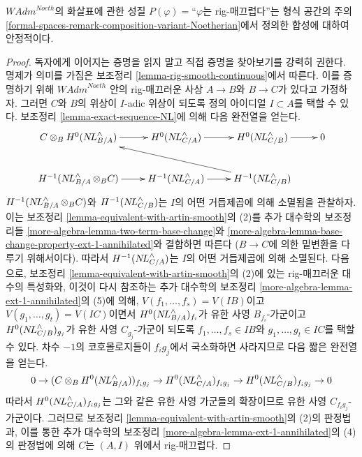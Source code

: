 \begin{lemma}
\label{lemma-composition-rig-smooth-continuous}
$\textit{WAdm}^{Noeth}$의 화살표에 관한 성질
$P(\varphi)=$``$\varphi$는 rig-매끄럽다''는 형식 공간의 주의
\ref{formal-spaces-remark-composition-variant-Noetherian}에서 정의한
합성에 대하여 안정적이다.
\end{lemma}

\begin{proof}
독자에게 이어지는 증명을 읽지 말고 직접 증명을 찾아보기를 강력히 권한다.
명제가 의미를 가짐은 보조정리 \ref{lemma-rig-smooth-continuous}에서 따른다.
이를 증명하기 위해 $\textit{WAdm}^{Noeth}$ 안의 rig-매끄러운 사상
$A \to B$와 $B \to C$가 있다고 가정하자.
그러면 $C$와 $B$의 위상이 $I$-adic 위상이 되도록
정의 아이디얼 $I \subset A$를 택할 수 있다.
보조정리 \ref{lemma-exact-sequence-NL}에 의해 다음 완전열을 얻는다.
$$
\xymatrix{
C \otimes_B H^0(\NL_{B/A}^\wedge) \ar[r] &
H^0(\NL_{C/A}^\wedge) \ar[r] &
H^0(\NL_{C/B}^\wedge) \ar[r] & 0 \\
H^{-1}(\NL_{B/A}^\wedge \otimes_B C) \ar[r] &
H^{-1}(\NL_{C/A}^\wedge) \ar[r] &
H^{-1}(\NL_{C/B}^\wedge) \ar[llu]
}
$$
$H^{-1}(\mathop{N\!L}\nolimits_{B/A}^\wedge \otimes_B C)$와
$H^{-1}(\mathop{N\!L}\nolimits_{C/B}^\wedge)$는 $I$의 어떤 거듭제곱에 의해 소멸됨을 관찰하자.
이는 보조정리 \ref{lemma-equivalent-with-artin-smooth}의 (2)를
추가 대수학의 보조정리들
\ref{more-algebra-lemma-two-term-base-change}와
\ref{more-algebra-lemma-base-change-property-ext-1-annihilated}와 결합하면 따른다
($B \to C$에 의한 밑변환을 다루기 위해서이다).
따라서 $H^{-1}(\mathop{N\!L}\nolimits_{C/A}^\wedge)$는 $I$의 어떤 거듭제곱에 의해 소멸된다.
다음으로, 보조정리 \ref{lemma-equivalent-with-artin-smooth}의 (2)에 있는
rig-매끄러운 대수의 특성화와, 이것이 다시 참조하는 추가 대수학의 보조정리
\ref{more-algebra-lemma-ext-1-annihilated}의 (5)에 의해,
$V(f_1, \ldots, f_s) = V(IB)$이고
$V(g_1, \ldots, g_t) = V(IC)$이면서
$H^0(\mathop{N\!L}\nolimits_{B/A}^\wedge)_{f_i}$가 유한 사영 $B_{f_i}$-가군이고
$H^0(\mathop{N\!L}\nolimits_{C/B}^\wedge)_{g_j}$가 유한 사영 $C_{g_j}$-가군이 되도록
$f_1, \ldots, f_s \in IB$와 $g_1, \ldots, g_t \in IC$를 택할 수 있다.
차수 $-1$의 코호몰로지들이 $f_ig_j$에서 국소화하면 사라지므로
다음 짧은 완전열을 얻는다.
$$
0 \to
(C \otimes_B H^0(\mathop{N\!L}\nolimits_{B/A}^\wedge))_{f_ig_j} \to
H^0(\mathop{N\!L}\nolimits_{C/A}^\wedge)_{f_ig_j} \to
H^0(\mathop{N\!L}\nolimits_{C/B}^\wedge)_{f_ig_j} \to 0
$$
따라서 $H^0(\mathop{N\!L}\nolimits_{C/A}^\wedge)_{f_ig_j}$는 그와 같은 유한 사영 가군들의
확장이므로 유한 사영 $C_{f_ig_j}$-가군이다.
그러므로 보조정리 \ref{lemma-equivalent-with-artin-smooth}의 (2)의 판정법과,
이를 통한 추가 대수학의 보조정리
\ref{more-algebra-lemma-ext-1-annihilated}의 (4)의 판정법에 의해
$C$는 $(A, I)$ 위에서 rig-매끄럽다.
\end{proof}

